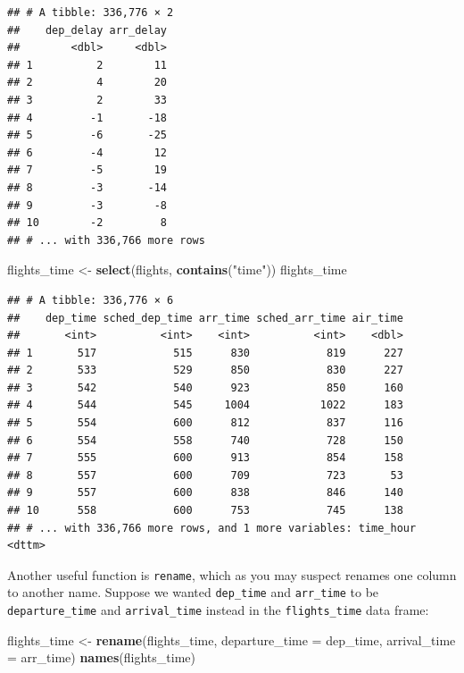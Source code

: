\documentclass[]{tufte-book}
\newenvironment{Shaded}{\begin{snugshade}}{\end{snugshade}}
\newcommand{\KeywordTok}[1]{\textcolor[rgb]{0.13,0.29,0.53}{\textbf{{#1}}}}
\newcommand{\DataTypeTok}[1]{\textcolor[rgb]{0.13,0.29,0.53}{{#1}}}
\newcommand{\StringTok}[1]{\textcolor[rgb]{0.31,0.60,0.02}{{#1}}}
\newcommand{\NormalTok}[1]{{#1}}
\begin{document}
\begin{verbatim}
## # A tibble: 336,776 × 2
##    dep_delay arr_delay
##        <dbl>     <dbl>
## 1          2        11
## 2          4        20
## 3          2        33
## 4         -1       -18
## 5         -6       -25
## 6         -4        12
## 7         -5        19
## 8         -3       -14
## 9         -3        -8
## 10        -2         8
## # ... with 336,766 more rows
\end{verbatim}

\begin{Shaded}
\begin{Highlighting}[]
\NormalTok{flights_time <-}\StringTok{ }\KeywordTok{select}\NormalTok{(flights, }\KeywordTok{contains}\NormalTok{(}\StringTok{"time"}\NormalTok{))}
\NormalTok{flights_time}
\end{Highlighting}
\end{Shaded}

\begin{verbatim}
## # A tibble: 336,776 × 6
##    dep_time sched_dep_time arr_time sched_arr_time air_time
##       <int>          <int>    <int>          <int>    <dbl>
## 1       517            515      830            819      227
## 2       533            529      850            830      227
## 3       542            540      923            850      160
## 4       544            545     1004           1022      183
## 5       554            600      812            837      116
## 6       554            558      740            728      150
## 7       555            600      913            854      158
## 8       557            600      709            723       53
## 9       557            600      838            846      140
## 10      558            600      753            745      138
## # ... with 336,766 more rows, and 1 more variables: time_hour <dttm>
\end{verbatim}

Another useful function is \texttt{rename}, which as you may suspect
renames one column to another name. Suppose we wanted \texttt{dep\_time}
and \texttt{arr\_time} to be \texttt{departure\_time} and
\texttt{arrival\_time} instead in the \texttt{flights\_time} data frame:

\begin{Shaded}
\begin{Highlighting}[]
\NormalTok{flights_time <-}\StringTok{ }\KeywordTok{rename}\NormalTok{(flights_time,}
                       \DataTypeTok{departure_time =} \NormalTok{dep_time,}
                       \DataTypeTok{arrival_time =} \NormalTok{arr_time)}
\KeywordTok{names}\NormalTok{(flights_time)}
\end{Highlighting}
\end{Shaded}
\end{document}
